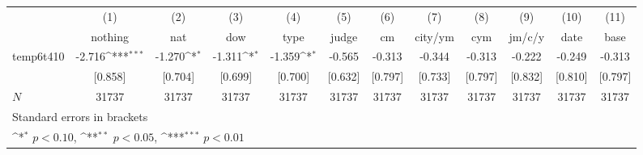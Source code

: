 {
\def\sym#1{\ifmmode^{#1}\else\(^{#1}\)\fi}
\begin{tabular}{l*{11}{c}}
\hline\hline
            &\multicolumn{1}{c}{(1)}&\multicolumn{1}{c}{(2)}&\multicolumn{1}{c}{(3)}&\multicolumn{1}{c}{(4)}&\multicolumn{1}{c}{(5)}&\multicolumn{1}{c}{(6)}&\multicolumn{1}{c}{(7)}&\multicolumn{1}{c}{(8)}&\multicolumn{1}{c}{(9)}&\multicolumn{1}{c}{(10)}&\multicolumn{1}{c}{(11)}\\
            &\multicolumn{1}{c}{nothing}&\multicolumn{1}{c}{nat}&\multicolumn{1}{c}{dow}&\multicolumn{1}{c}{type}&\multicolumn{1}{c}{judge}&\multicolumn{1}{c}{cm}&\multicolumn{1}{c}{city/ym}&\multicolumn{1}{c}{cym}&\multicolumn{1}{c}{jm/c/y}&\multicolumn{1}{c}{date}&\multicolumn{1}{c}{base}\\
\hline
temp6t410   &      -2.716\sym{***}&      -1.270\sym{*}  &      -1.311\sym{*}  &      -1.359\sym{*}  &      -0.565         &      -0.313         &      -0.344         &      -0.313         &      -0.222         &      -0.249         &      -0.313         \\
            &     [0.858]         &     [0.704]         &     [0.699]         &     [0.700]         &     [0.632]         &     [0.797]         &     [0.733]         &     [0.797]         &     [0.832]         &     [0.810]         &     [0.797]         \\
\hline
\(N\)       &       31737         &       31737         &       31737         &       31737         &       31737         &       31737         &       31737         &       31737         &       31737         &       31737         &       31737         \\
\hline\hline
\multicolumn{12}{l}{\footnotesize Standard errors in brackets}\\
\multicolumn{12}{l}{\footnotesize \sym{*} \(p<0.10\), \sym{**} \(p<0.05\), \sym{***} \(p<0.01\)}\\
\end{tabular}
}
